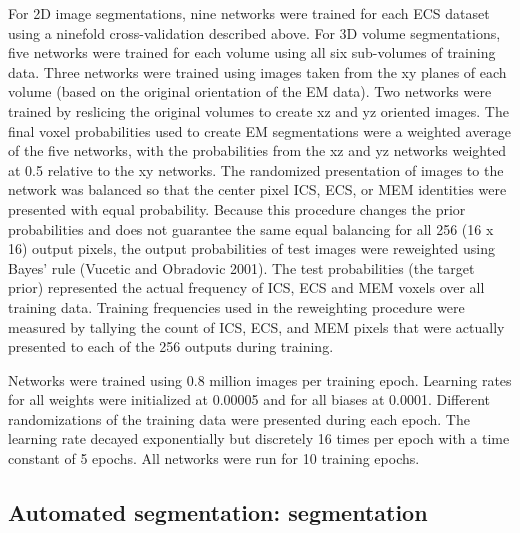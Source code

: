\documentclass{article}
\begin{document}
For 2D image segmentations, nine networks were trained for each ECS dataset using a ninefold cross-validation described above. For 3D volume segmentations, five networks were trained for each volume using all six sub-volumes of training data. Three networks were trained using images taken from the xy planes of each volume (based on the original orientation of the EM data). Two networks were trained by reslicing the original volumes to create xz and yz oriented images. The final voxel probabilities used to create EM segmentations were a weighted average of the five networks, with the probabilities from the xz and yz networks weighted at 0.5 relative to the xy networks. The randomized presentation of images to the network was balanced so that the center pixel ICS, ECS, or MEM identities were presented with equal probability. Because this procedure changes the prior probabilities and does not guarantee the same equal balancing for all 256 (16 x 16) output pixels, the output probabilities of test images were reweighted using Bayes’ rule (Vucetic and Obradovic 2001). The test probabilities (the target prior) represented the actual frequency of ICS, ECS and MEM voxels over all training data. Training frequencies used in the reweighting procedure were measured by tallying the count of ICS, ECS, and MEM pixels that were actually presented to each of the 256 outputs during training.

Networks were trained using 0.8 million images per training epoch. Learning rates for all weights were initialized at 0.00005 and for all biases at 0.0001. Different randomizations of the training data were presented during each epoch. The learning rate decayed exponentially but discretely 16 times per epoch with a time constant of 5 epochs. All networks were run for 10 training epochs.

\subsection*{Automated segmentation: segmentation}
\end{document}
